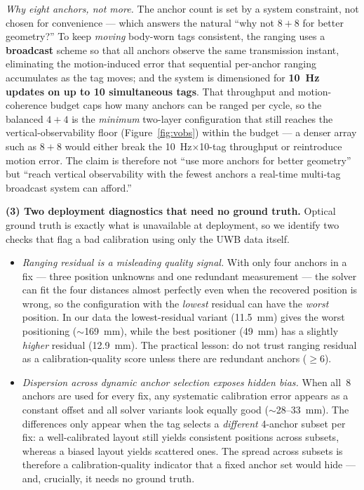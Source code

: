 \documentclass[11pt,a4paper]{article}
\begin{document}
\emph{Why eight anchors, not more.} The anchor count is set by a system constraint, not chosen for
convenience --- which answers the natural ``why not $8{+}8$ for better geometry?'' To keep
\emph{moving} body-worn tags consistent, the ranging uses a \textbf{broadcast} scheme so that all
anchors observe the same transmission instant, eliminating the motion-induced error that sequential
per-anchor ranging accumulates as the tag moves; and the system is dimensioned for \textbf{10~Hz
updates on up to 10 simultaneous tags}. That throughput and motion-coherence budget caps how many
anchors can be ranged per cycle, so the balanced $4{+}4$ is the \emph{minimum} two-layer configuration
that still reaches the vertical-observability floor (Figure~\ref{fig:vobs}) within the budget --- a
denser array such as $8{+}8$ would either break the 10~Hz$\times$10-tag throughput or reintroduce
motion error. The claim is therefore not ``use more anchors for better geometry'' but ``reach
vertical observability with the fewest anchors a real-time multi-tag broadcast system can afford.''

\textbf{(3) Two deployment diagnostics that need no ground truth.} Optical ground truth is exactly
what is unavailable at deployment, so we identify two checks that flag a bad calibration using only
the UWB data itself.

\begin{itemize}
\item \emph{Ranging residual is a misleading quality signal.} With only four anchors in a fix --- three
      position unknowns and one redundant measurement --- the solver can fit the four distances
      almost perfectly even when the recovered position is wrong, so the configuration with the
      \emph{lowest} residual can have the \emph{worst} position. In our data the lowest-residual
      variant (11.5~mm) gives the worst positioning ($\sim$169~mm), while the best positioner
      (49~mm) has a slightly \emph{higher} residual (12.9~mm). The practical lesson: do not trust
      ranging residual as a calibration-quality score unless there are redundant anchors
      ($\geq 6$).
\item \emph{Dispersion across dynamic anchor selection exposes hidden bias.} When all~8 anchors are
      used for every fix, any systematic calibration error appears as a constant offset and all
      solver variants look equally good ($\sim$28--33~mm). The differences only appear when the tag
      selects a \emph{different} 4-anchor subset per fix: a well-calibrated layout still yields
      consistent positions across subsets, whereas a biased layout yields scattered ones. The
      spread across subsets is therefore a calibration-quality indicator that a fixed anchor set
      would hide --- and, crucially, it needs no ground truth.
\end{itemize}
\end{document}
